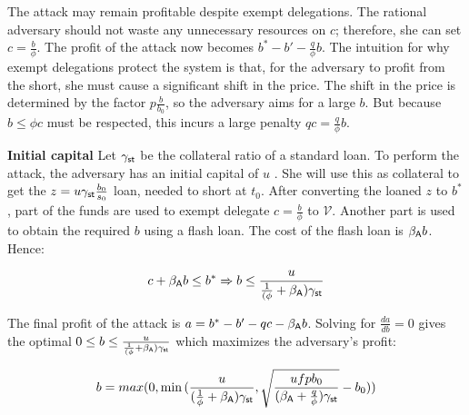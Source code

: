 The attack may remain profitable despite exempt delegations.
The rational adversary should not waste any unnecessary resources on
$c$; therefore, she can set $c = \frac{b}{\phi}$. The profit of the attack now
becomes $b^* - b' - \frac{q}{\phi}b$.
The intuition for why exempt delegations protect the system is that,
for the adversary to profit from the short, she must cause a significant
shift in the price. The shift in the price is determined by the factor
$p\frac{b}{b_0}$, so the adversary aims for a large $b$. But because $b \leq \phi c$
must be respected, this incurs a large penalty $qc = \frac{q}{\phi}b$.

\noindent
\textbf{Initial capital}
Let $\gamma_{\textsf{st}}$ be the collateral ratio of a standard \stasset
loan.
To perform the attack, the adversary has an initial capital of $u$ \asset.
She will use this as collateral to get the $z = u \gamma_{\textsf{st}} \frac{b_0}{s_0}$ \stasset
loan, needed to short \stasset at $t_0$.
After converting the loaned $z$ \stasset to $b^*$ \asset, part
of the funds are used to exempt delegate $c = \frac{b}{\phi}$ \asset
to $\mathcal{V}$. Another part
is used to obtain the required $b$ \asset using a flash loan. The cost of
the flash loan is $\beta_{\textsf{A}} b$. Hence:

\begin{gather*}
  c + \beta_{\textsf{A}} b \leq b^*\Rightarrow
  b \leq \frac{u}{\frac{1}{(\phi} + \beta_{\textsf{A}})\gamma_{\textsf{st}}}
\end{gather*}

The final profit of the attack is $a = b^* - b' - qc - \beta_{\textsf{A}} b$.
Solving for $\frac{da}{db} = 0$ gives the optimal $0 \leq b \leq \frac{u}{\frac{1}{(\phi} + \beta_{\textsf{A}}) \gamma_{\textsf{st}}}$ which
maximizes the adversary's profit:

\begin{align*}
  b = max{(0, \min{(\frac{u}{(\frac{1}{\phi} + \beta_{\textsf{A}})\gamma_{\textsf{st}}},\sqrt{\frac{u f p b_0}{(\beta_{\textsf{A}}+ \frac{q}{\phi})\gamma_{\textsf{st}}}} - b_0)})}
\end{align*}


%
%

